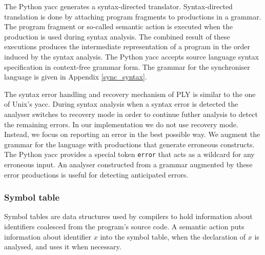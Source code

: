 The Python yacc generates a syntax-directed translator. Syntax-directed translation is done by attaching program fragments to productions in a grammar. The program fragment or so-called semantic action is executed when the production is used during syntax analysis. The combined result of these executions produces the intermediate representation of a program in the order induced by the syntax analysis. The Python yacc accepts source language syntax specification in context-free grammar form. The grammar for the synchroniser language is given in Appendix \ref{sync_syntax}.

The syntax error handling and recovery mechanism of PLY is similar to the one of Unix's yacc. During syntax analysis when a syntax error is detected the analyser switches to recovery mode in order to continue futher analysis to detect the remaining errors. In our implementation we do not use recovery mode. Instead, we focus on reporting an error in the best possible way. We augment the grammar for the language with productions that generate erroneous constructs. The Python yacc provides a special token \texttt{error} that acts as a wildcard for any erroneous input. An analyser constructed from a grammar augmented by these error productions is useful for detecting anticipated errors.




  \subsubsection{Symbol table}
Symbol tables are data structures used by compilers to hold information about identifiers coalesced from the program's source code. A semantic action puts information about identifier $x$ into the symbol table, when the declaration of $x$ is analysed, and uses it when necessary.

